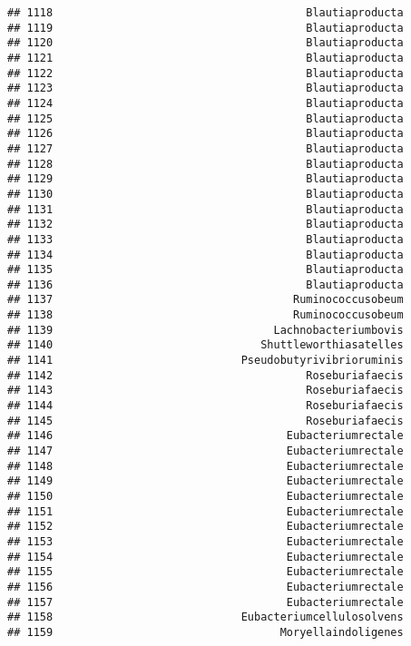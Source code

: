 \documentclass[
]{article}
\begin{document}
\begin{verbatim}
## 1118                                       Blautiaproducta
## 1119                                       Blautiaproducta
## 1120                                       Blautiaproducta
## 1121                                       Blautiaproducta
## 1122                                       Blautiaproducta
## 1123                                       Blautiaproducta
## 1124                                       Blautiaproducta
## 1125                                       Blautiaproducta
## 1126                                       Blautiaproducta
## 1127                                       Blautiaproducta
## 1128                                       Blautiaproducta
## 1129                                       Blautiaproducta
## 1130                                       Blautiaproducta
## 1131                                       Blautiaproducta
## 1132                                       Blautiaproducta
## 1133                                       Blautiaproducta
## 1134                                       Blautiaproducta
## 1135                                       Blautiaproducta
## 1136                                       Blautiaproducta
## 1137                                     Ruminococcusobeum
## 1138                                     Ruminococcusobeum
## 1139                                  Lachnobacteriumbovis
## 1140                                Shuttleworthiasatelles
## 1141                             Pseudobutyrivibrioruminis
## 1142                                       Roseburiafaecis
## 1143                                       Roseburiafaecis
## 1144                                       Roseburiafaecis
## 1145                                       Roseburiafaecis
## 1146                                    Eubacteriumrectale
## 1147                                    Eubacteriumrectale
## 1148                                    Eubacteriumrectale
## 1149                                    Eubacteriumrectale
## 1150                                    Eubacteriumrectale
## 1151                                    Eubacteriumrectale
## 1152                                    Eubacteriumrectale
## 1153                                    Eubacteriumrectale
## 1154                                    Eubacteriumrectale
## 1155                                    Eubacteriumrectale
## 1156                                    Eubacteriumrectale
## 1157                                    Eubacteriumrectale
## 1158                             Eubacteriumcellulosolvens
## 1159                                   Moryellaindoligenes

\end{verbatim}
\end{document}
